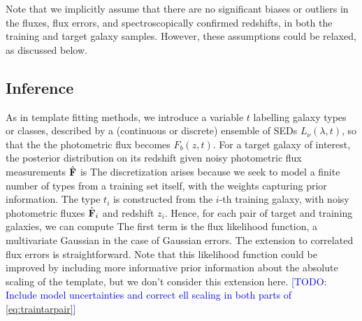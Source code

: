 \documentclass[aps,prd,showpacs,superscriptaddress,groupedaddress]{revtex4}  %
\newcommand{\todo}[1]{\textcolor{blue}{[TODO: #1]}}
\begin{document}
Note that we implicitly assume that there are no significant biases or outliers in the fluxes, flux errors, and spectroscopically confirmed redshifts, in both the training and target galaxy samples. 
However, these assumptions could be relaxed, as discussed below.

\subsection{Inference}

As in template fitting methods, we introduce a variable $t$ labelling galaxy types or classes, described by a (continuous or discrete) ensemble of SEDs $L_\nu(\lambda, t)$, so that the the photometric flux becomes $F_b(z, t)$.
For a target galaxy of interest, the posterior distribution on its redshift given noisy photometric flux measurements $\hat{\mat{F}}$ is
 The discretization arises because we seek to model a finite number of types from a training set itself, with the weights capturing prior information. 
 The type $t_i$ is constructed from the $i$-th training galaxy, with noisy photometric fluxes $\hat{\mat{F}}_i$ and redshift $z_i$. 
 Hence, for each pair of target and training galaxies, we can compute 
The first term is the flux likelihood function, \eg a multivariate Gaussian in the case of Gaussian errors.
The extension to correlated flux errors is straightforward.
Note that this likelihood function could be improved by including more informative prior information about the absolute scaling of the template, but we don't consider this extension here.
\todo{Include model uncertainties and correct ell scaling in both parts of \eqref{eq:traintarpair}}
	
\end{document}
